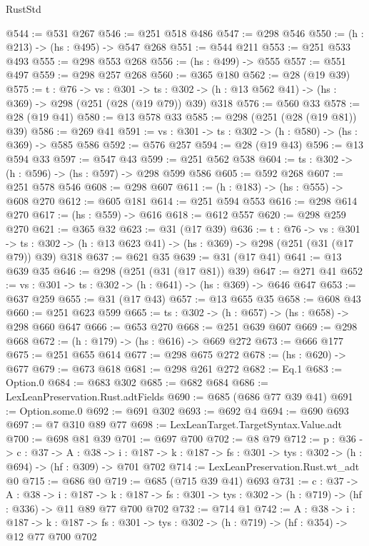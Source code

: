 \begin{lexlean}{RustStd}
\begin{coremodule}
@544 := @531 @267
@546 := @251 @518 @486
@547 := @298 @546
@550 := (h : @213) -> (hs : @495) -> @547 @268
@551 := @544 @211
@553 := @251 @533 @493
@555 := @298 @553 @268
@556 := (hs : @499) -> @555
@557 := @551 @497
@559 := @298 @257 @268
@560 := @365 @180
@562 := @28 (@19 @39)
@575 := {t : @76} ->
  {vs : @301} ->
  {ts : @302} -> (h : @13 @562 @41) -> (hs : @369) -> @298 (@251 (@28 (@19 @79)) @39) @318
@576 := @560 @33
@578 := @28 (@19 @41)
@580 := @13 @578 @33
@585 := @298 (@251 (@28 (@19 @81)) @39)
@586 := @269 @41
@591 := {vs : @301} -> {ts : @302} -> (h : @580) -> (hs : @369) -> @585 @586
@592 := @576 @257
@594 := @28 (@19 @43)
@596 := @13 @594 @33
@597 := @547 @43
@599 := @251 @562 @538
@604 := {ts : @302} -> (h : @596) -> (hs : @597) -> @298 @599 @586
@605 := @592 @268
@607 := @251 @578 @546
@608 := @298 @607
@611 := (h : @183) -> (hs : @555) -> @608 @270
@612 := @605 @181
@614 := @251 @594 @553
@616 := @298 @614 @270
@617 := (hs : @559) -> @616
@618 := @612 @557
@620 := @298 @259 @270
@621 := @365 @32
@623 := @31 (@17 @39)
@636 := {t : @76} ->
  {vs : @301} ->
  {ts : @302} -> (h : @13 @623 @41) -> (hs : @369) -> @298 (@251 (@31 (@17 @79)) @39) @318
@637 := @621 @35
@639 := @31 (@17 @41)
@641 := @13 @639 @35
@646 := @298 (@251 (@31 (@17 @81)) @39)
@647 := @271 @41
@652 := {vs : @301} -> {ts : @302} -> (h : @641) -> (hs : @369) -> @646 @647
@653 := @637 @259
@655 := @31 (@17 @43)
@657 := @13 @655 @35
@658 := @608 @43
@660 := @251 @623 @599
@665 := {ts : @302} -> (h : @657) -> (hs : @658) -> @298 @660 @647
@666 := @653 @270
@668 := @251 @639 @607
@669 := @298 @668
@672 := (h : @179) -> (hs : @616) -> @669 @272
@673 := @666 @177
@675 := @251 @655 @614
@677 := @298 @675 @272
@678 := (hs : @620) -> @677
@679 := @673 @618
@681 := @298 @261 @272
@682 := Eq.{1}
@683 := Option.{0}
@684 := @683 @302
@685 := @682 @684
@686 := LexLeanPreservation.Rust.adtFields
@690 := @685 (@686 @77 @39 @41)
@691 := Option.some.{0}
@692 := @691 @302
@693 := @692 @4
@694 := @690 @693
@697 := @7 @310 @89 @77
@698 := LexLeanTarget.TargetSyntax.Value.adt
@700 := @698 @81 @39
@701 := @697 @700
@702 := @8 @79
@712 := {p : @36} ->
  {c : @37} ->
  {A : @38} ->
  {i : @187} -> {k : @187} -> {fs : @301} -> {tys : @302} -> (h : @694) -> (hf : @309) -> @701 @702
@714 := LexLeanPreservation.Rust.wt_adt @0
@715 := @686 @0
@719 := @685 (@715 @39 @41) @693
@731 := {c : @37} ->
  {A : @38} ->
  {i : @187} ->
  {k : @187} -> {fs : @301} -> {tys : @302} -> (h : @719) -> (hf : @336) -> @11 @89 @77 @700 @702
@732 := @714 @1
@742 := {A : @38} ->
  {i : @187} ->
  {k : @187} -> {fs : @301} -> {tys : @302} -> (h : @719) -> (hf : @354) -> @12 @77 @700 @702

\end{coremodule}
\end{lexlean}
